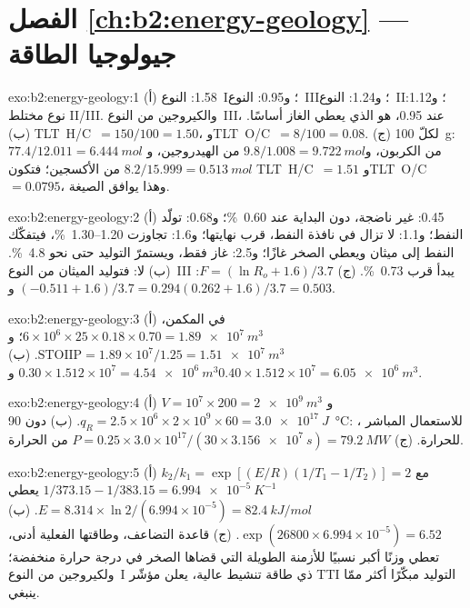 \section*{الفصل \ref{ch:b2:energy-geology} --- جيولوجيا الطاقة}

\begin{solution}{exo:b2:energy-geology:1}
(أ) 1.58: النوع~I؛ و0.95: النوع~III؛ و1.24: النوع~II؛ و1.12: نوع مختلط II/III. والكيروجين من النوع~III،
عند 0.95، هو الذي يعطي الغاز أساسًا. (ب) \mbox{\textdir TLT H/C $= 150/100 = 1.50$}، و\mbox{\textdir TLT O/C $= 8/100 = 0.08$}. (ج) لكلّ \qty{100}{g}:
$77.4/12.011 = \qty{6.444}{mol}$ من الكربون، و$9.8/1.008 = \qty{9.722}{mol}$ من الهيدروجين، و$8.2/15.999 =
\qty{0.513}{mol}$ من الأكسجين؛ فتكون \mbox{\textdir TLT H/C $= 1.51$} و\mbox{\textdir TLT O/C $= 0.0795$}، وهذا يوافق الصيغة.
\end{solution}

\begin{solution}{exo:b2:energy-geology:2}
(أ) 0.45: غير ناضجة، دون البداية عند \qty{0.60}{\percent}؛ و0.68: تولّد النفط؛ و1.1: لا تزال في
نافذة النفط، قرب نهايتها؛ و1.6: تجاوزت 1.20--\qty{1.30}{\percent}، فيتفكّك النفط إلى ميثان
ويعطي الصخر غازًا؛ و2.5: غاز فقط، ويستمرّ التوليد حتى نحو \qty{4.8}{\percent}. (ب) لا: فتوليد
الميثان من النوع~III يبدأ قرب \qty{0.73}{\percent}. (ج) $F = (\ln R_o + 1.6)/3.7$: $(-0.511 +
1.6)/3.7 = 0.294$ و$(0.262 + 1.6)/3.7 = 0.503$.
\end{solution}

\begin{solution}{exo:b2:energy-geology:3}
(أ) في المكمن، $6 \times 10^6 \times 25 \times 0.18 \times 0.70 = \qty{1.89e7}{m^3}$؛
و$\mathrm{STOIIP} = 1.89 \times 10^7/1.25 = \qty{1.51e7}{m^3}$. (ب) $0.30 \times 1.512 \times 10^7 =
\qty{4.54e6}{m^3}$ و$0.40 \times 1.512 \times 10^7 = \qty{6.05e6}{m^3}$.
\end{solution}

\begin{solution}{exo:b2:energy-geology:4}
(أ) $V = 10^7 \times 200 = \qty{2e9}{m^3}$ و$q_R = 2.5 \times 10^6 \times 2 \times 10^9 \times 60
= \qty{3.0e17}{J}$. (ب) دون \qty{90}{\celsius}: ، للاستعمال المباشر
للحرارة. (ج) $P = 0.25 \times 3.0 \times 10^{17}/(30 \times \qty{3.156e7}{s}) = \qty{79.2}{MW}$ من الحرارة.
\end{solution}

\begin{solution}{exo:b2:energy-geology:5}
(أ) $k_2/k_1 = \exp[(E/R)(1/T_1 - 1/T_2)] = 2$ مع $1/373.15 - 1/383.15 = \qty{6.994e-5}{K^{-1}}$
يعطي $E = 8.314 \times \ln 2/(6.994 \times 10^{-5}) = \qty{82.4}{kJ/mol}$. (ب) $\exp(26800 \times
6.994 \times 10^{-5}) = 6.52$. (ج) قاعدة التضاعف، وطاقتها الفعلية أدنى، تعطي وزنًا
أكبر نسبيًا للأزمنة الطويلة التي قضاها الصخر في درجة حرارة منخفضة؛ ولكيروجين من النوع~I ذي طاقة
تنشيط عالية، يعلن مؤشّر TTI التوليد مبكّرًا أكثر ممّا ينبغي.
\end{solution}

